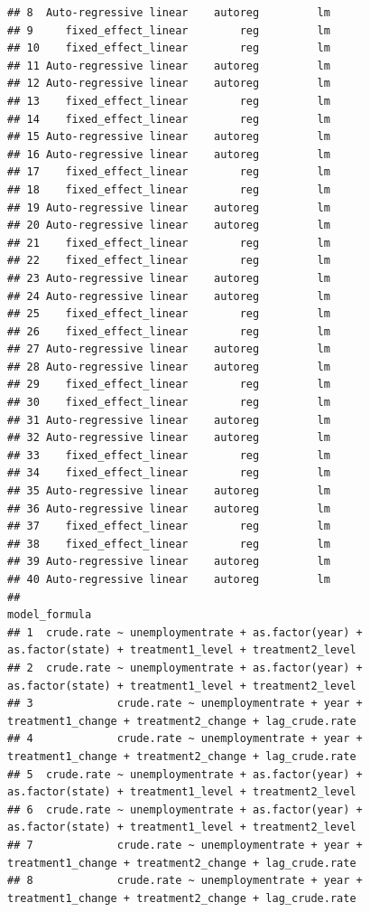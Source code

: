 \documentclass[
]{article}
\begin{document}
\begin{verbatim}
## 8  Auto-regressive linear    autoreg         lm
## 9     fixed_effect_linear        reg         lm
## 10    fixed_effect_linear        reg         lm
## 11 Auto-regressive linear    autoreg         lm
## 12 Auto-regressive linear    autoreg         lm
## 13    fixed_effect_linear        reg         lm
## 14    fixed_effect_linear        reg         lm
## 15 Auto-regressive linear    autoreg         lm
## 16 Auto-regressive linear    autoreg         lm
## 17    fixed_effect_linear        reg         lm
## 18    fixed_effect_linear        reg         lm
## 19 Auto-regressive linear    autoreg         lm
## 20 Auto-regressive linear    autoreg         lm
## 21    fixed_effect_linear        reg         lm
## 22    fixed_effect_linear        reg         lm
## 23 Auto-regressive linear    autoreg         lm
## 24 Auto-regressive linear    autoreg         lm
## 25    fixed_effect_linear        reg         lm
## 26    fixed_effect_linear        reg         lm
## 27 Auto-regressive linear    autoreg         lm
## 28 Auto-regressive linear    autoreg         lm
## 29    fixed_effect_linear        reg         lm
## 30    fixed_effect_linear        reg         lm
## 31 Auto-regressive linear    autoreg         lm
## 32 Auto-regressive linear    autoreg         lm
## 33    fixed_effect_linear        reg         lm
## 34    fixed_effect_linear        reg         lm
## 35 Auto-regressive linear    autoreg         lm
## 36 Auto-regressive linear    autoreg         lm
## 37    fixed_effect_linear        reg         lm
## 38    fixed_effect_linear        reg         lm
## 39 Auto-regressive linear    autoreg         lm
## 40 Auto-regressive linear    autoreg         lm
##                                                                                               model_formula
## 1  crude.rate ~ unemploymentrate + as.factor(year) + as.factor(state) + treatment1_level + treatment2_level
## 2  crude.rate ~ unemploymentrate + as.factor(year) + as.factor(state) + treatment1_level + treatment2_level
## 3             crude.rate ~ unemploymentrate + year + treatment1_change + treatment2_change + lag_crude.rate
## 4             crude.rate ~ unemploymentrate + year + treatment1_change + treatment2_change + lag_crude.rate
## 5  crude.rate ~ unemploymentrate + as.factor(year) + as.factor(state) + treatment1_level + treatment2_level
## 6  crude.rate ~ unemploymentrate + as.factor(year) + as.factor(state) + treatment1_level + treatment2_level
## 7             crude.rate ~ unemploymentrate + year + treatment1_change + treatment2_change + lag_crude.rate
## 8             crude.rate ~ unemploymentrate + year + treatment1_change + treatment2_change + lag_crude.rate

\end{verbatim}
\end{document}
